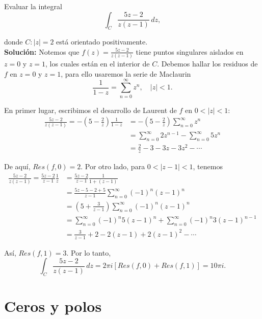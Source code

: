 \begin{ejemplo}
Evaluar la integral
$$\int_C \frac{5z-2}{z(z-1)} \,dz,$$

donde $C: |z| = 2$ está orientado positivamente.
\\

\textbf{Solución:} Notemos que $f(z) = \frac{5z-2}{z(z-1)}$ tiene puntos singulares aislados en $z = 0$ y $z = 1$, los cuales están en el interior de $C$. Debemos hallar los residuos de $f$ en $z = 0$ y $z = 1$, para ello usaremos la serie de Maclaurin
$$\frac{1}{1-z} = \sum_{n=0}^{\infty} z^n, \quad |z| < 1.$$

En primer lugar, escribimos el desarrollo de Laurent de $f$ en $0 < |z| < 1$:
\begin{align*}
 \frac{5z-2}{z(z-1)} = - \left( 5 - \frac{2}{z}\right) \frac{1}{1-z} &= - \left( 5 - \frac{2}{z}\right)  \sum_{n=0}^{\infty} z^n \\
 &= \sum_{n=0}^{\infty} 2z^{n-1} - \sum_{n=0}^{\infty} 5 z^n \\
 &= \frac{2}{z} - 3 - 3z - 3z^2 - \cdots 
\end{align*}

De aquí, $Res(f,0) = 2$. Por otro lado, para $0 < |z-1| < 1$, tenemos 
\begin{align*}
    \frac{5z-2}{z(z-1)} = \frac{5z-2}{z-1} \frac{1}{z} &= \frac{5z-2}{z-1} \frac{1}{1 + (z-1)} \\
    &= \frac{5z-5-2+5}{z-1} \sum_{n=0}^{\infty} (-1)^n (z-1)^n \\
    &= \left(5 + \frac{3}{z-1} \right) \sum_{n=0}^{\infty} (-1)^n (z-1)^n \\
    &=  \sum_{n=0}^{\infty} (-1)^n 5 (z-1)^n +  \sum_{n=0}^{\infty} (-1)^n 3 (z-1)^{n-1} \\
    &= \frac{3}{z-1} +2 -2(z-1) + 2(z-1)^2 - \cdots
\end{align*}

Así, $Res(f,1) = 3$. Por lo tanto,
$$\int_C \frac{5z-2}{z(z-1)} \,dz = 2\pi i\left[ Res(f,0) + Res(f,1)\right] = 10 \pi i.$$

\end{ejemplo}

\section{Ceros y polos}

